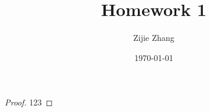 \documentclass{article}
\title{Homework 1}
\author{Zijie Zhang}
\date\today
\begin{document}
\maketitle

\begin{proof}
    123
\end{proof}
\end{document}
